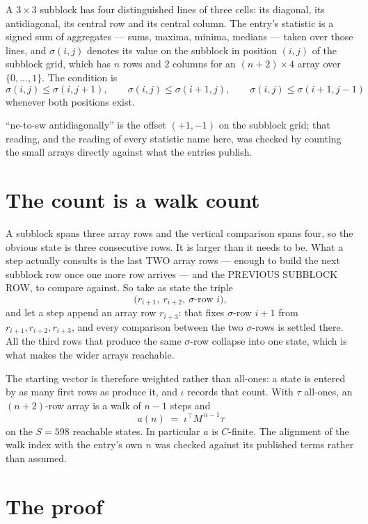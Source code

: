 \documentclass[11pt,a4paper]{article}
\theoremstyle{plain}
\theoremstyle{definition}
\begin{document}
A $3\times3$ subblock has four distinguished lines of three cells: its diagonal, its
antidiagonal, its central row and its central column. The entry's statistic is a signed sum of
aggregates --- sums, maxima, minima, medians --- taken over those lines, and $\sigma(i,j)$
denotes its value on the subblock in position $(i,j)$ of the subblock grid, which has $n$ rows
and $2$ columns for an $(n+2)\times4$ array over $\{0,\dots,1\}$. The condition is
\[
\sigma(i,j)\le\sigma(i,j+1),\qquad \sigma(i,j)\le\sigma(i+1,j),\qquad \sigma(i,j)\le\sigma(i+1,j-1)
\]
whenever both positions exist.

``ne-to-sw antidiagonally'' is the offset $(+1,-1)$ on the subblock grid; that reading, and
the reading of every statistic name here, was checked by counting the small arrays directly
against what the entries publish.

\section{The count is a walk count}

A subblock spans three array rows and the vertical comparison spans four, so the obvious state
is three consecutive rows. It is larger than it needs to be. What a step actually consults is
the last TWO array rows --- enough to build the next subblock row once one more row arrives ---
and the PREVIOUS SUBBLOCK ROW, to compare against. So take as state the triple
\[
\bigl(r_{i+1},\ r_{i+2},\ \sigma\text{-row }i\bigr),
\]
and let a step append an array row $r_{i+3}$: that fixes $\sigma$-row $i+1$ from
$r_{i+1},r_{i+2},r_{i+3}$, and every comparison between the two $\sigma$-rows is settled
there. All the third rows that produce the same $\sigma$-row collapse into one state, which is
what makes the wider arrays reachable.

The starting vector is therefore weighted rather than all-ones: a state is entered by as many
first rows as produce it, and $\iota$ records that count. With $\tau$ all-ones, an
$(n+2)$-row array is a walk of $n-1$ steps and
\[
a(n)\;=\;\iota^{\!\top}M^{\,n-1}\tau
\]
on the $S=598$ reachable states. In particular $a$ is $C$-finite. The alignment of the walk
index with the entry's own $n$ was checked against its published terms rather than assumed.

\section{The proof}
\end{document}

